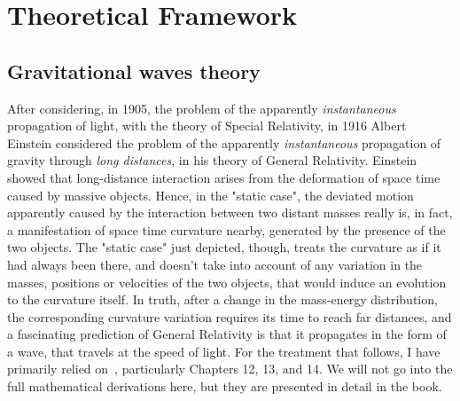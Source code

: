 \chapter{Theoretical Framework}


\section{Gravitational waves theory}
After considering, in 1905, the problem of the apparently \textit{instantaneous} propagation of light, with the theory of Special Relativity, in 1916 Albert Einstein considered the problem of the apparently \textit{instantaneous} propagation of gravity through \textit{long distances}, in his theory of General Relativity.
Einstein showed that long-distance interaction arises from the deformation of space time caused by massive objects.
Hence, in the "static case", the deviated motion apparently caused by the interaction between two distant masses really is, in fact, a manifestation of space time curvature nearby, generated by the presence of the two objects.
The "static case" just depicted, though, treats the curvature as if it had always been there, and doesn't take into account of any variation in the masses, positions or velocities of the two objects, that would induce an evolution to the curvature itself.
In truth, after a change in the mass-energy distribution, the corresponding curvature variation requires its time to reach far distances, and a fascinating prediction of General Relativity is that it propagates in the form of a wave, that travels at the speed of light.
For the treatment that follows, I have primarily relied on~\cite{ferrari2020general}, particularly Chapters 12, 13, and 14.
We will not go into the full mathematical derivations here, but they are presented in detail in the book.

